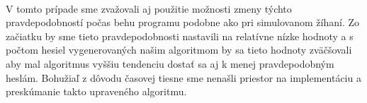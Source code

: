 \paragraph{}
V tomto prípade sme zvažovali aj použitie možnosti zmeny týchto pravdepodobností počas behu programu podobne ako pri simulovanom žíhaní. Zo začiatku by sme tieto pravdepodobnosti nastavili na relatívne nízke hodnoty a s počtom hesiel vygenerovaných našim algoritmom by sa tieto hodnoty zväčšovali aby mal algoritmus vyššiu tendenciu dostať sa aj k menej pravdepodobným heslám. Bohužiaľ z dôvodu časovej tiesne sme nenašli priestor na implementáciu a preskúmanie takto upraveného algoritmu.